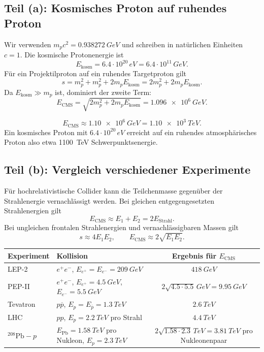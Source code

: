 \documentclass[11pt,a4paper]{scrartcl}
\newcommand{\anti}[1]{\overline{#1}}
\newcommand{\pbar}{\anti{p}}
\newcommand{\Ecm}{E_{\mathrm{CMS}}}
\theoremstyle{definition}
\theoremstyle{plain}
\theoremstyle{remark}
\begin{document}
\subsection{Teil (a): Kosmisches Proton auf ruhendes Proton}

\begin{calculationbox}
Wir verwenden $m_pc^2=\SI{0.938272}{GeV}$ und schreiben in natürlichen Einheiten $c=1$.
Die kosmische Protonenergie ist
\[
    E_{\mathrm{kosm}}=6.4\cdot 10^{20}\,\si{eV}
    =6.4\cdot 10^{11}\,\si{GeV}.
\]
Für ein Projektilproton auf ein ruhendes Targetproton gilt
\[
    s = m_p^2+m_p^2+2m_pE_{\mathrm{kosm} }
      =2m_p^2+2m_pE_{\mathrm{kosm}}.
\]
Da $E_{\mathrm{kosm}}\gg m_p$ ist, dominiert der zweite Term:
\[
    \Ecm=\sqrt{2m_p^2+2m_pE_{\mathrm{kosm}}}
    =\SI{1.096e6}{GeV}.
\]
\end{calculationbox}

\begin{answerbox}
\[
    \boxed{\Ecm \approx \SI{1.10e6}{GeV}=\SI{1.10e3}{TeV}.}
\]
Ein kosmisches Proton mit $6.4\cdot 10^{20}\,\si{eV}$ erreicht auf ein ruhendes atmosphärisches Proton also etwa \SI{1100}{TeV} Schwerpunktsenergie.
\end{answerbox}

\subsection{Teil (b): Vergleich verschiedener Experimente}

\begin{calculationbox}
Für hochrelativistische Collider kann die Teilchenmasse gegenüber der Strahlenergie vernachlässigt werden. Bei gleichen entgegengesetzten Strahlenergien gilt
\[
    \Ecm \approx E_1+E_2 = 2E_{\mathrm{Strahl}}.
\]
Bei ungleichen frontalen Strahlenergien und vernachlässigbaren Massen gilt
\[
    s\approx 4E_1E_2,
    \qquad
    \Ecm\approx 2\sqrt{E_1E_2}.
\]
\end{calculationbox}

\begin{center}
\begin{tabular}{llc}
\toprule
Experiment & Kollision & Ergebnis für $\Ecm$ \\
\midrule
LEP-2 & $e^+e^-$, $E_{e^+}=E_{e^-}=\SI{209}{GeV}$
      & $\SI{418}{GeV}$ \\
PEP-II & $e^+e^-$, $E_{e^+}=\SI{4.5}{GeV}$, $E_{e^-}=\SI{5.5}{GeV}$
      & $2\sqrt{4.5\cdot 5.5}\,\si{GeV}=\SI{9.95}{GeV}$ \\
Tevatron & $p\pbar$, $E_p=E_{\pbar}=\SI{1.3}{TeV}$
      & $\SI{2.6}{TeV}$ \\
LHC & $pp$, $E_p=\SI{2.2}{TeV}$ pro Strahl
      & $\SI{4.4}{TeV}$ \\
$^{208}\mathrm{Pb}-p$ & $E_{\mathrm{Pb}}=\SI{1.58}{TeV}$ pro Nukleon, $E_p=\SI{2.3}{TeV}$
      & $2\sqrt{1.58\cdot 2.3}\,\si{TeV}=\SI{3.81}{TeV}$ pro Nukleonenpaar \\
\bottomrule
\end{tabular}
\end{center}
\end{document}
